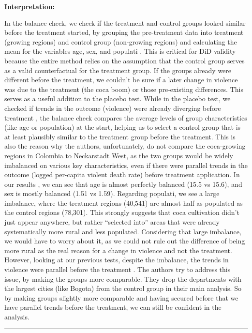 \documentclass[
]{article}
\begin{document}
\textbf{Interpretation:}

In the balance check, we check if the treatment and control groups
looked similar before the treatment started, by grouping the
pre-treatment data into treatment (growing regions) and control group
(non-growing regions) and calculating the mean for the variables age,
sex, and populati . This is critical for DiD validity because the entire
method relies on the assumption that the control group serves as a valid
counterfactual for the treatment group. If the groups already were
different before the treatment, we couldn't be sure if a later change in
violence was due to the treatment (the coca boom) or those pre-existing
differences. This serves as a useful addition to the placebo test. While
in the placebo test, we checked if trends in the outcome (violence) were
already diverging before treatment , the balance check compares the
average levels of group characteristics (like age or population) at the
start, helping us to select a control group that is at least plausibly
similar to the treatment group before the treatment. This is also the
reason why the authors, unfortunately, do not compare the coca-growing
regions in Colombia to Neckarstadt West, as the two groups would be
widely imbalanced on various key characteristics, even if there were
parallel trends in the outcome (logged per-capita violent death rate)
before treatment application. In our results , we can see that age is
almost perfectly balanced (15.5 vs 15.6), and sex is mostly balanced
(1.51 vs 1.59). Regarding populati, we see a large imbalance, where the
treatment regions (40,541) are almost half as populated as the control
regions (78,301). This strongly suggests that coca cultivation didn't
just appear anywhere, but rather ``selected into'' areas that were
already systematically more rural and less populated. Considering that
large imbalance, we would have to worry about it, as we could not rule
out the difference of being more rural as the real reason for a change
in violence and not the treatment. However, looking at our previous
tests, despite the imbalance, the trends in violence were parallel
before the treatment . The authors try to address this issue, by making
the groups more comparable. They drop the departments with the largest
cities (like Bogota) from the control group in their main analysis. So
by making groups slightly more comparable and having secured before that
we have parallel trends before the treatment, we can still be confident
in the analysis.

\begin{center}\rule{0.5\linewidth}{0.5pt}\end{center}
\end{document}
